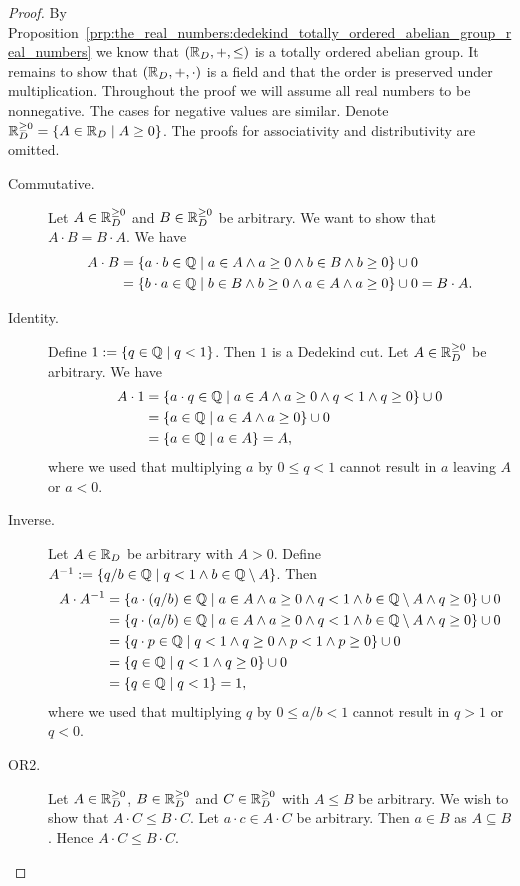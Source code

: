 \documentclass[../main.tex]{subfiles}
\begin{document}
\begin{proof}
    By Proposition~\ref{prp:the_real_numbers:dedekind_totally_ordered_abelian_group_real_numbers} we know that $(\mathbb{R}_D,+,\leq)$ is a totally ordered abelian group. It remains to show that $(\mathbb{R}_D,+,\cdot)$ is a field and that the order is preserved under multiplication. Throughout the proof we will assume all real numbers to be nonnegative. The cases for negative values are similar. Denote $\mathbb{R}_D^{\geq0}=\{A\in\mathbb{R}_D\mid A\geq0\}$. The proofs for associativity and distributivity are omitted.
    \begin{description}
        \item[Commutative.] Let $A\in\mathbb{R}_D^{\geq0}$ and $B\in\mathbb{R}_D^{\geq0}$ be arbitrary. We want to show that $A\cdot B=B\cdot A$. We have
        \begin{align*}
            A\cdot B & =\{a\cdot b\in\mathbb{Q}\mid a\in A\land a\geq0\land b\in B\land b\geq0\}\cup0 \\
            & =\{b\cdot a\in\mathbb{Q}\mid b\in B\land b\geq0\land a\in A\land a\geq0\}\cup0=B\cdot A.
        \end{align*}
        \item[Identity.] Define $1:=\{q\in\mathbb{Q}\mid q<1\}$. Then $1$ is a Dedekind cut. Let $A\in\mathbb{R}_D^{\geq0}$ be arbitrary. We have
        \begin{align*}
            A\cdot1 & =\{a\cdot q\in\mathbb{Q}\mid a\in A\land a\geq0\land q<1\land q\geq0\}\cup0 \\
            & =\{a\in\mathbb{Q}\mid a\in A\land a\geq0\}\cup0 \\
            & =\{a\in\mathbb{Q}\mid a\in A\}=A,
        \end{align*}
        where we used that multiplying $a$ by $0\leq q<1$ cannot result in $a$ leaving $A$ or $a<0$.
        \item[Inverse.] Let $A\in\mathbb{R}_D$ be arbitrary with $A>0$. Define $A^{-1}:=\{q/b\in\mathbb{Q}\mid q<1\land b\in\mathbb{Q}\setminus A\}$. Then
        \begin{align*}
            A\cdot A^{-1} & =\{a\cdot(q/b)\in\mathbb{Q}\mid a\in A\land a\geq0\land q<1\land b\in\mathbb{Q}\setminus A\land q\geq0\}\cup0 \\
            & =\{q\cdot(a/b)\in\mathbb{Q}\mid a\in A\land a\geq0\land q<1\land b\in\mathbb{Q}\setminus A\land q\geq0\}\cup0 \\
            & =\{q\cdot p\in\mathbb{Q}\mid q<1\land q\geq0\land p<1\land p\geq0\}\cup0 \\
            & =\{q\in\mathbb{Q}\mid q<1\land q\geq0\}\cup0 \\
            & =\{q\in\mathbb{Q}\mid q<1\}=1,
        \end{align*}
        where we used that multiplying $q$ by $0\leq a/b<1$ cannot result in $q>1$ or $q<0$.
        \item[OR2.] Let $A\in\mathbb{R}_D^{\geq0}$, $B\in\mathbb{R}_D^{\geq0}$ and $C\in\mathbb{R}_D^{\geq0}$ with $A\leq B$ be arbitrary. We wish to show that $A\cdot C\leq B\cdot C$. Let $a\cdot c\in A\cdot C$ be arbitrary. Then $a\in B$ as $A\subseteq B$. Hence $A\cdot C\leq B\cdot C$.
    \end{description}
\end{proof}
\end{document}
